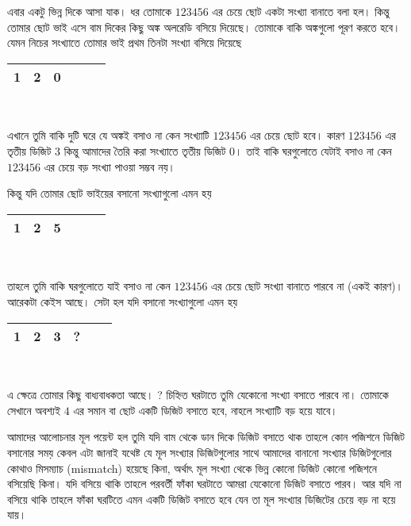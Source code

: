 এবার একটু ভিন্ন দিকে আসা যাক। ধর তোমাকে $123456$ এর চেয়ে ছোট একটা সংখ্যা বানাতে বলা হল। কিন্তু তোমার ছোট ভাই এসে বাম দিকের কিছু অঙ্ক অলরেডি বসিয়ে দিয়েছে। তোমাকে বাকি অঙ্কগুলো পূরণ করতে হবে। যেমন নিচের সংখ্যাতে তোমার ভাই প্রথম তিনটা সংখ্যা বসিয়ে দিয়েছে 

\begin{center}
\begin{tabular}{ |c|c|c|c|c|c| }
 \hline
 1 & 2 & 0 & & & \\
 \hline
\end{tabular} \\ 
\end{center}

এখানে তুমি বাকি দুটি ঘরে যে অঙ্কই বসাও না কেন সংখ্যাটি $123456$ এর চেয়ে ছোট হবে।  কারণ $123456$ এর তৃতীয় ডিজিট $3$ কিন্তু আমাদের তৈরি করা সংখ্যাতে তৃতীয় ডিজিট $0$। তাই বাকি ঘরগুলোতে যেটাই বসাও না কেন $123456$ এর চেয়ে বড় সংখ্যা পাওয়া সম্ভব নয়। 

কিন্তু যদি তোমার ছোট ভাইয়ের বসানো সংখ্যাগুলো এমন হয় 

\begin{center}
\begin{tabular}{ |c|c|c|c|c|c| }
 \hline
 1 & 2 & 5 & & & \\
 \hline
\end{tabular} \\ 
\end{center}

তাহলে তুমি বাকি ঘরগুলোতে যাই বসাও না কেন $123456$ এর চেয়ে ছোট সংখ্যা বানাতে পারবে না (একই কারণ)। আরেকটা কেইস আছে। সেটা হল যদি বসানো সংখ্যাগুলো এমন হয় 

\begin{center}
\begin{tabular}{ |c|c|c|c|c|c| }
 \hline
 1 & 2 & 3 & ? & & \\
 \hline
\end{tabular} \\ 
\end{center}
 
 এ ক্ষেত্রে তোমার কিছু বাধ্যবাধকতা আছে। ? চিহ্নিত ঘরটাতে তুমি যেকোনো সংখ্যা বসাতে পারবে না। তোমাকে সেখানে অবশ্যই $4$ এর সমান বা ছোট একটি ডিজিট বসাতে হবে, নাহলে সংখ্যাটি বড় হয়ে যাবে। 
 
আমাদের আলোচনার মূল পয়েন্ট হল তুমি যদি বাম থেকে ডান দিকে ডিজিট বসাতে থাক তাহলে কোন পজিশনে ডিজিট বসানোর সময় কেবল এটা জানাই যথেষ্ট যে মূল সংখ্যার ডিজিটগুলোর সাথে আমাদের বানানো সংখ্যার ডিজিটগুলোর কোথাও মিসম্যাচ (mismatch) হয়েছে কিনা, অর্থাৎ মূল সংখ্যা থেকে ভিন্ন কোনো ডিজিট কোনো পজিশনে বসিয়েছি কিনা। যদি বসিয়ে থাকি তাহলে পরবর্তী ফাঁকা ঘরটাতে আমরা যেকোনো ডিজিট বসাতে পারব। আর যদি না বসিয়ে থাকি তাহলে ফাঁকা ঘরটিতে এমন একটি ডিজিট বসাতে হবে যেন তা মূল সংখ্যার ডিজিটের চেয়ে বড় না হয়ে যায়।
